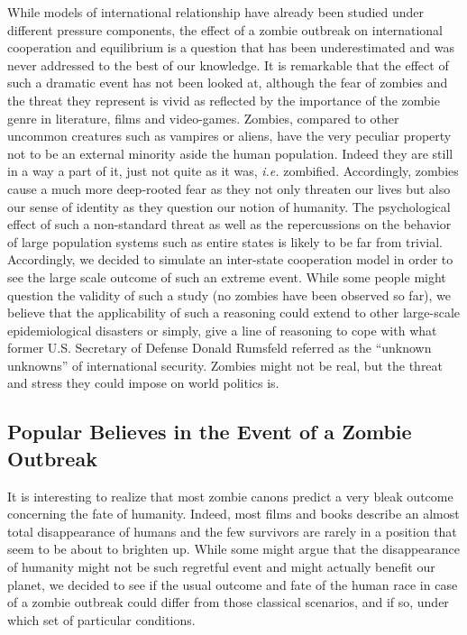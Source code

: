 \documentclass[11pt]{article} %
\begin{document}
While models of international relationship have already been studied under different pressure components, the effect of a zombie outbreak on international cooperation and equilibrium is a question that has been underestimated and was never addressed to the best of our knowledge. It is remarkable that the effect of such a dramatic event has not been looked at, although the fear of zombies and the threat they represent is vivid as reflected by the importance of the zombie genre in literature, films and video-games. \textcolor[rgb]{1,0,0}{Zombies, compared to other uncommon creatures such as vampires or aliens, have the very peculiar property not to be an external minority aside the human population. Indeed they are still  in a way a part of it, just not quite as it was, \textit{i.e.} zombified.} Accordingly, zombies cause a much more deep-rooted fear as they not only threaten our lives but also our sense of identity as they question our notion of humanity. The psychological effect of such a non-standard threat as well as the repercussions on the behavior of large population systems such as entire states is likely to be far from trivial. Accordingly, we decided to simulate an inter-state cooperation model in order to see the large scale outcome of such an extreme event. While some people might question the validity of such a study (no zombies have been observed so far), we believe that the applicability of such a reasoning could extend to other large-scale epidemiological disasters or simply, give a line of reasoning to cope with what former U.S. Secretary of Defense Donald Rumsfeld referred as the ``unknown unknowns'' of international security. Zombies might not be real, but the threat and stress they could impose on world politics is.



\subsection{Popular Believes in the Event of a Zombie Outbreak}\indent

It is interesting to realize that most zombie canons predict a very bleak outcome concerning the fate of humanity. Indeed, most films and books describe an almost total disappearance of humans and the few survivors are rarely in a position that seem to be about to brighten up. While some might argue that the disappearance of humanity might not be such regretful event and might actually benefit our planet, we decided to see if the usual outcome and fate of the human race in case of a zombie outbreak could differ from those classical scenarios, and if so, under which set of particular conditions. 
\end{document}
